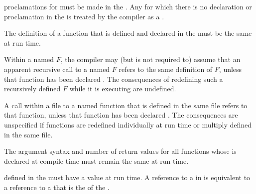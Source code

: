  \itemitem{\bull}  proclamations for 
must be made in the .  Any 
for which there is no  declaration or proclamation in
the  is treated by the compiler as
a .


 \itemitem{\bull} The definition of a function that is defined and
declared  in the  must be
the same at run time.
 
  
 \itemitem{\bull} Within a  named $F$, the compiler may
(but is not required to)
assume that an apparent recursive call to a  named $F$ 
refers to the same definition of $F$,
unless that function has been declared .
The consequences of redefining such a recursively defined  $F$ 
while it is executing are undefined.

 \itemitem{\bull} A call within a file to a named function that is
defined in the same file refers to that function, unless that function
has been declared .  The consequences are unspecified
if functions are redefined individually at run time or multiply
defined in the same file.

  
 \itemitem{\bull} The argument syntax and number of return values for
all functions whose  is declared at compile time must
remain the same at run time.
 
 \itemitem{\bull}  defined in
the  must have a  value at
run time.  A reference to 
a  
in  is equivalent to a reference to 
a   that is the  of the .
 
